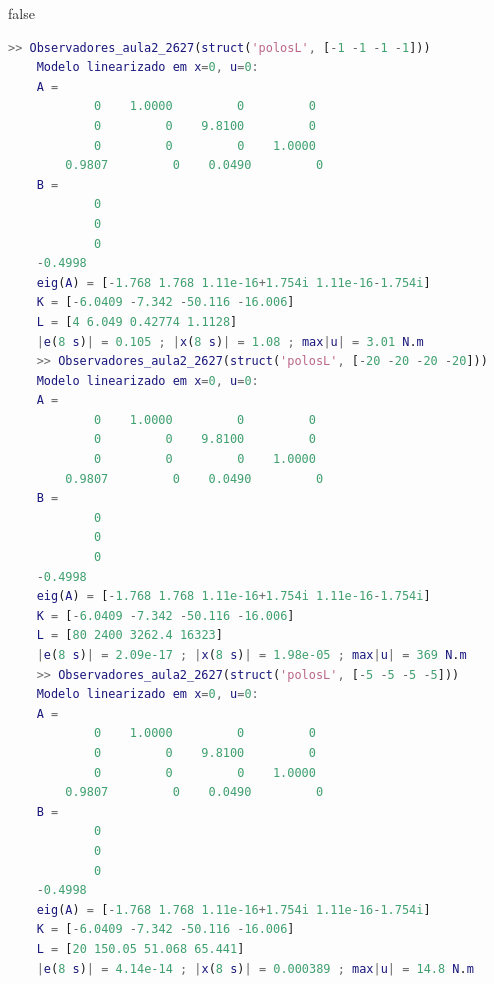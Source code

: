 \documentclass[12pt]{report}
\begin{document}
\if false   
\begin{lstlisting}[language=Matlab, caption={Resultados}, label={lst:result}, numbers=none]
    >> Observadores_aula2_2627(struct('polosL', [-1 -1 -1 -1]))
    Modelo linearizado em x=0, u=0:
    A =
            0    1.0000         0         0
            0         0    9.8100         0
            0         0         0    1.0000
        0.9807         0    0.0490         0
    B =
            0
            0
            0
    -0.4998
    eig(A) = [-1.768 1.768 1.11e-16+1.754i 1.11e-16-1.754i]
    K = [-6.0409 -7.342 -50.116 -16.006]
    L = [4 6.049 0.42774 1.1128]
    |e(8 s)| = 0.105 ; |x(8 s)| = 1.08 ; max|u| = 3.01 N.m
    >> Observadores_aula2_2627(struct('polosL', [-20 -20 -20 -20]))
    Modelo linearizado em x=0, u=0:
    A =
            0    1.0000         0         0
            0         0    9.8100         0
            0         0         0    1.0000
        0.9807         0    0.0490         0
    B =
            0
            0
            0
    -0.4998
    eig(A) = [-1.768 1.768 1.11e-16+1.754i 1.11e-16-1.754i]
    K = [-6.0409 -7.342 -50.116 -16.006]
    L = [80 2400 3262.4 16323]
    |e(8 s)| = 2.09e-17 ; |x(8 s)| = 1.98e-05 ; max|u| = 369 N.m
    >> Observadores_aula2_2627(struct('polosL', [-5 -5 -5 -5]))
    Modelo linearizado em x=0, u=0:
    A =
            0    1.0000         0         0
            0         0    9.8100         0
            0         0         0    1.0000
        0.9807         0    0.0490         0
    B =
            0
            0
            0
    -0.4998
    eig(A) = [-1.768 1.768 1.11e-16+1.754i 1.11e-16-1.754i]
    K = [-6.0409 -7.342 -50.116 -16.006]
    L = [20 150.05 51.068 65.441]
    |e(8 s)| = 4.14e-14 ; |x(8 s)| = 0.000389 ; max|u| = 14.8 N.m
\end{lstlisting}
\fi
\end{document}
